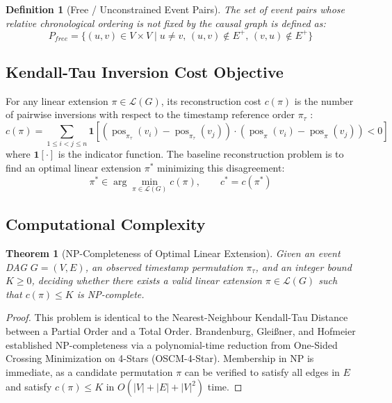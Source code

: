 \documentclass[journal]{IEEEtran}
\DeclareMathOperator{\pos}{pos}
\newtheorem{theorem}{Theorem}
\newtheorem{definition}{Definition}
\begin{document}
\begin{definition}[Free / Unconstrained Event Pairs]
The set of event pairs whose relative chronological ordering is not fixed by the causal graph is defined as:
\begin{equation}
P_{free} = \{(u, v) \in V \times V \mid u \neq v, \, (u, v) \notin E^+, \, (v, u) \notin E^+\}
\end{equation}
\end{definition}

\subsection{Kendall-Tau Inversion Cost Objective}
For any linear extension $\pi \in \mathcal{L}(G)$, its reconstruction cost $c(\pi)$ is the number of pairwise inversions with respect to the timestamp reference order $\pi_\tau$ \cite{Kendall1938}:
\begin{equation}
c(\pi) = \sum_{1 \le i < j \le n} \mathbf{1}\left[ \left( \pos_{\pi_\tau}(v_i) - \pos_{\pi_\tau}(v_j) \right) \cdot \left( \pos_\pi(v_i) - \pos_\pi(v_j) \right) < 0 \right]
\end{equation}
where $\mathbf{1}[\cdot]$ is the indicator function. The baseline reconstruction problem is to find an optimal linear extension $\pi^*$ minimizing this disagreement:
\begin{equation}
\pi^* \in \arg\min_{\pi \in \mathcal{L}(G)} c(\pi), \qquad c^* = c(\pi^*)
\end{equation}

\subsection{Computational Complexity}

\begin{theorem}[NP-Completeness of Optimal Linear Extension]
Given an event DAG $G = (V, E)$, an observed timestamp permutation $\pi_\tau$, and an integer bound $K \ge 0$, deciding whether there exists a valid linear extension $\pi \in \mathcal{L}(G)$ such that $c(\pi) \le K$ is NP-complete.
\end{theorem}

\begin{proof}
This problem is identical to the Nearest-Neighbour Kendall-Tau Distance between a Partial Order and a Total Order. Brandenburg, Gleißner, and Hofmeier \cite{Brandenburg2011} established NP-completeness via a polynomial-time reduction from One-Sided Crossing Minimization on 4-Stars (OSCM-4-Star). Membership in NP is immediate, as a candidate permutation $\pi$ can be verified to satisfy all edges in $E$ and satisfy $c(\pi) \le K$ in $O(|V| + |E| + |V|^2)$ time.
\end{proof}
\end{document}
